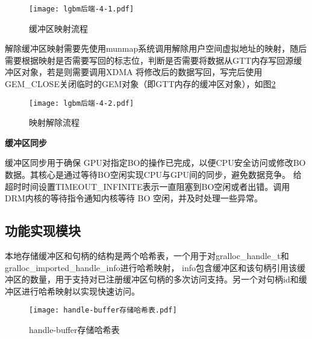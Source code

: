 \begin{figure}[h]
  \centering
  \texttt{[image: lgbm后端-4-1.pdf]}
  \caption{缓冲区映射流程}
  \label{fig:lgbm后端-4-1}
\end{figure} 

解除缓冲区映射需要先使用munmap系统调用解除用户空间虚拟地址的映射，随后需要根据映射是否需要写回的标志位，判断是否需要将数据从GTT内存写回源缓冲区对象，若是则需要调用XDMA
将修改后的数据写回，写完后使用GEM\_CLOSE关闭临时的GEM对象（即GTT内存的缓冲区对象），如图\ref{fig:lgbm后端-4-2}

\begin{figure}[h]
  \centering
  \texttt{[image: lgbm后端-4-2.pdf]}
  \caption{映射解除流程}
  \label{fig:lgbm后端-4-2}
\end{figure} 

\textbf{缓冲区同步}

缓冲区同步用于确保 GPU对指定BO的操作已完成，以便CPU安全访问或修改BO数据。其核心是通过​等待BO空闲​实现CPU与GPU间的同步，避免数据竞争。
给超时时间设置TIMEOUT\_INFINITE表示一直阻塞到BO空闲或者出错。调用DRM内核的等待指令通知内核等待 BO 空闲，并及时处理一些异常。

\subsection{功能实现模块}

本地存储缓冲区和句柄的结构是两个哈希表，一个用于对gralloc\_handle\_t和gralloc\_imported\_handle\_info进行哈希映射，
info包含缓冲区和该句柄引用该缓冲区的数量，用于支持对已注册缓冲区句柄的多次访问支持。另一个对句柄id和缓冲区进行哈希映射以实现快速访问。

\begin{figure}[h]
  \centering
  \texttt{[image: handle-buffer存储哈希表.pdf]}
  \caption{handle-buffer存储哈希表}
  \label{fig:handle-buffer存储哈希表}
\end{figure}

